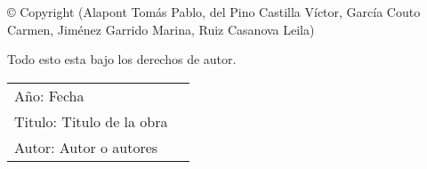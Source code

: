 \newpage
\thispagestyle{empty}
\begin{flushleft} © Copyright (Alapont Tomás Pablo, del Pino Castilla Víctor, García Couto Carmen, Jiménez Garrido Marina, Ruiz Casanova Leila)

Todo esto esta bajo los derechos de autor. 
\vspace{16mm}

\begin{tabular}{@{}lp{\textwidth-10em}}
Año: Fecha  \\
Titulo: Titulo de la obra\\
Autor: Autor o autores\\
\end{tabular}
\end{flushleft}